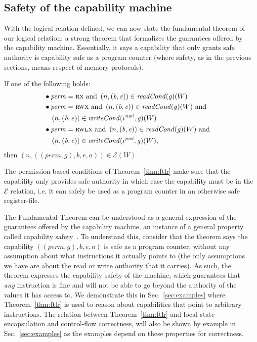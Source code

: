 \documentclass{llncs}
\newcommand{\sectionname}{Sec.}
\newcommand{\var}[1]{\mathit{#1}}
\newcommand{\gl}{\var{g}}
\newcommand{\addr}{\var{a}}
\newcommand{\start}{\var{b}}
\newcommand{\addrend}{\var{e}}
\newcommand{\perm}{\var{perm}}
\newcommand{\nwl}{\var{nwl}}
\newcommand{\pwl}{\var{pwl}}
\newcommand{\plainfun}[2]{
  \ifthenelse{\equal{#2}{}}
  {\mathit{#1}}
  {\mathit{#1}(#2)}
}
\newcommand{\readCond}[1]{\plainfun{readCond}{#1}}
\newcommand{\writeCond}[1]{\plainfun{writeCond}{#1}}
\newcommand{\asmType}{\plaindom{AsmType}}
\newcommand{\plaindom}[1]{\mathrm{#1}}
\newcommand{\intr}[2]{\mathcal{#1}}
\newcommand{\exprintr}[1]{\intr{E}{#1}}
\newcommand{\stder}{\exprintr{\asmType}}
\newcommand{\npair}[2][n]{\left(#1,#2 \right)}
\newcommand{\plainperm}[1]{\textsc{#1}}
\newcommand{\exec}{\plainperm{rx}}
\newcommand{\rwx}{\plainperm{rwx}}
\newcommand{\rwlx}{\plainperm{rwlx}}
\begin{document}
\subsection{Safety of the capability machine}
With the logical relation defined, we can now state the fundamental theorem of
our logical relation: a strong theorem that formalizes the guarantees offered by
the capability machine. Essentially, it says a capability that only grants safe
authority is capability safe as a program counter (where safety, as in the
previous sections, means respect of memory protocols).
\begin{theorem}
  \label{thm:ftlr}
  If one of the following holds:
  \begin{align*}
      & \bullet
        \begin{aligned}[t]
        &\perm = \exec \text{ and }\npair{(\start,\addrend)} \in \readCond{}(\gl)(W)
      \end{aligned} \\
    & \bullet 
      \begin{aligned}[t]
        &\perm = \rwx \text{ and } \npair{(\start,\addrend)} \in \readCond{}(\gl)(W) \text{ and }\\
        &\npair{(\start,\addrend)} \in \writeCond{}(\iota^\nwl,\gl)(W)
      \end{aligned} \\
    & \bullet 
      \begin{aligned}[t]
        &\perm = \rwlx \text{ and }\npair{(\start,\addrend)} \in \readCond{}(\gl)(W) \text{ and }\\
        &\npair{(\start,\addrend)} \in \writeCond{}(\iota^\pwl,\gl)(W),
      \end{aligned}
  \end{align*}
  then $\npair{((\perm,\gl),\start,\addrend,\addr)} \in \stder(W)$
\end{theorem}
The permission based conditions of Theorem~\ref{thm:ftlr} make sure that the
capability only provides safe authority in which case the capability must be in
the $\stder$ relation, i.e. it can safely be used as a program counter in an
otherwise safe register-file.

The Fundamental Theorem can be understood as a general expression of the
guarantees offered by the capability machine, an instance of a general property
called capability safety~\cite{Devriese:2016ObjCap,Maffeis2010OC}. To
understand this, consider that the theorem says the capability
$((\perm,\gl),\start,\addrend,\addr)$ is safe as a program counter, without any
assumption about what instructions it actually points to (the only assumptions
we have are about the read or write authority that it carries). As such, the
theorem expresses the capability safety of the machine, which guarantees that
\emph{any} instruction is fine and will not be able to go beyond the authority
of the values it has access to. We demonstrate this in
\sectionname~\ref{sec:examples} where Theorem~\ref{thm:ftlr} is used to reason about
capabilities that point to arbitrary instructions. The relation between
Theorem~\ref{thm:ftlr} and local-state encapsulation and control-flow
correctness, will also be shown by example in \sectionname~\ref{sec:examples} as the
examples depend on these properties for correctness.
\end{document}
